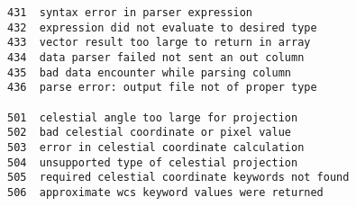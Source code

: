 \documentclass[11pt]{book}
\begin{document}
\begin{verbatim}
431  syntax error in parser expression
432  expression did not evaluate to desired type
433  vector result too large to return in array
434  data parser failed not sent an out column
435  bad data encounter while parsing column
436  parse error: output file not of proper type

501  celestial angle too large for projection
502  bad celestial coordinate or pixel value
503  error in celestial coordinate calculation
504  unsupported type of celestial projection
505  required celestial coordinate keywords not found
506  approximate wcs keyword values were returned
\end{verbatim}
\end{document}
